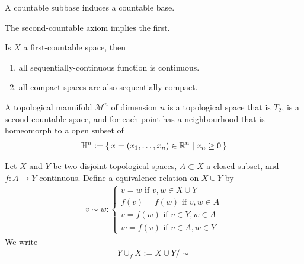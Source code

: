 \begin{rembox}
    \begin{remark}
        A countable subbase induces a countable base.
    \end{remark}
\end{rembox}

\begin{thmbox}
    \begin{lemma}
        The second-countable axiom implies the first.
    \end{lemma}
\end{thmbox}

\begin{thmbox}
    \begin{lemma}
        Is \(X\) a first-countable space, then
        \begin{enumerate}
            \item all sequentially-continuous function is continuous.
            \item all compact spaces are also sequentially compact.
        \end{enumerate}
    \end{lemma}
\end{thmbox}

\begin{defbox}
    \begin{definition}
        A topological mannifold \(\mathcal{M}^n\) of dimension \(n\) is a topological space that is \(T_2\), is a second-countable space, and for each point has a neighbourhood that is homeomorph to a open subset of
        \begin{align*}
            \mathbb{H}^n := \left\{\, x = (x_1, \ldots, x_n) \in \mathbb{R}^n \mid x_n \geq 0 \,\right\}
        \end{align*}
    \end{definition}
\end{defbox}

\begin{defbox}
    \begin{definition}[Pasting]
        Let \(X\) and \(Y\) be two disjoint topological spaces, \(A \subset X\) a closed subset, and \(f: A \longrightarrow Y\) continuous. Define a equivalence relation on \(X \cup Y\) by
        \begin{align*}
            v \sim w :
            \begin{cases}
                v = w \text{ if } v, w \in X \cup Y \\
                f(v) = f(w) \text{ if } v, w \in A \\
                v = f(w) \text{ if } v \in Y, w \in A \\
                w = f(v) \text{ if } v \in A, w \in Y
            \end{cases}
        \end{align*}
        We write
        \begin{align*}
            Y \cup_f X := X \cup Y / \sim
        \end{align*}
    \end{definition}
\end{defbox}